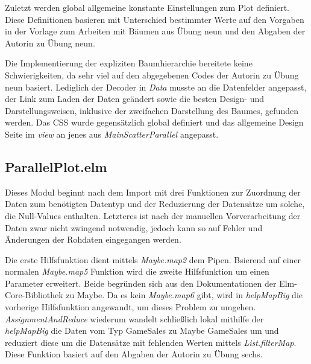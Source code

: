 \documentclass[usegeometry=true]{scrartcl}
\begin{document}
Zuletzt werden global allgemeine konstante Einstellungen zum Plot definiert. 
Diese Definitionen basieren mit Unterschied bestimmter Werte auf den Vorgaben in der Vorlage zum Arbeiten mit Bäumen aus Übung neun und den Abgaben der Autorin zu Übung neun. 

Die Implementierung der expliziten Baumhierarchie bereitete keine Schwierigkeiten, da sehr viel auf den abgegebenen Codes der Autorin zu Übung neun basiert. 
Lediglich der Decoder in \textit{Data} musste an die Datenfelder angepasst, der Link zum Laden der Daten geändert sowie die besten Design- und Darstellungsweisen, inklusive der zweifachen Darstellung des Baumes, gefunden werden. 
Das CSS wurde gegensätzlich global definiert und das allgemeine Design Seite im \textit{view} an jenes aus \textit{MainScatterParallel} angepasst. 

\subsection{ParallelPlot.elm}
Dieses Modul beginnt nach dem Import mit drei Funktionen zur Zuordnung der Daten zum benötigten Datentyp und der Reduzierung der Datensätze um solche, die Null-Values enthalten. 
Letzteres ist nach der manuellen Vorverarbeitung der Daten zwar nicht zwingend notwendig, jedoch kann so auf Fehler und Änderungen der Rohdaten eingegangen werden. 

Die erste Hilfsfunktion dient mittels \textit{Maybe.map2} dem Pipen.
Bsierend auf einer normalen \textit{Maybe.map5} Funktion wird die zweite Hilfsfunktion um einen Parameter erweitert. 
Beide begründen sich aus den Dokumentationen der Elm-Core-Bibliothek zu Maybe.%
Da es kein \textit{Maybe.map6} gibt, wird in \textit{helpMapBig} die vorherige Hilfsfunktion angewandt, um dieses Problem zu umgehen. 
\textit{AssignmentAndReduce} wiederum wandelt schließlich lokal mithilfe der \textit{helpMapBig} die Daten vom Typ GameSales zu Maybe GameSales um und reduziert diese um die Datensätze mit fehlenden Werten mittels \textit{List.filterMap}.
Diese Funktion basiert auf den Abgaben der Autorin zu Übung sechs.
\end{document}
